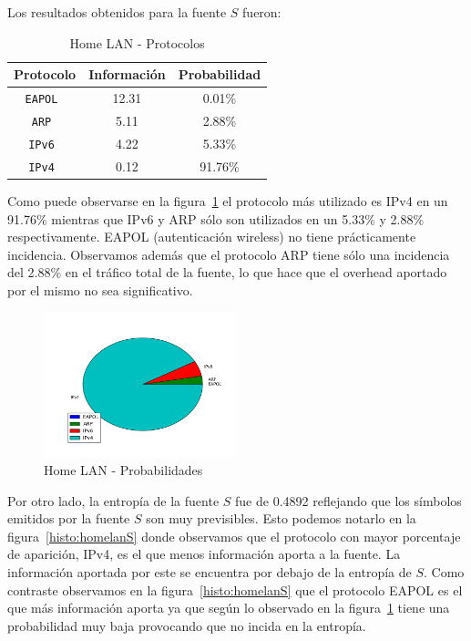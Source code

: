 \documentclass[final,inline,narroweqnarray,a4paper]{ieee}
\begin{document}
Los resultados obtenidos para la fuente $S$ fueron:

\begin{table}[H]
    \begin{center}
        \begin{tabular}{|c|c|c|}
            \hline
            \textbf{Protocolo} & \textbf{Información} & \textbf{Probabilidad} \\ \hline
            \texttt{EAPOL     }& 12.31       & 0.01\%     \\ \hline
            \texttt{ARP       }& 5.11        & 2.88\%     \\ \hline
            \texttt{IPv6      }& 4.22        & 5.33\%     \\ \hline
            \texttt{IPv4      }& 0.12        & 91.76\%    \\ \hline
        \end{tabular}
        \caption{Home LAN - Protocolos}
        \label{table:homelanS}
    \end{center}
\end{table}

Como puede observarse en la figura~\ref{torta:homelanS} el protocolo más utilizado es IPv4 en un 91.76\% mientras que IPv6 y ARP sólo son utilizados en un 5.33\% y 2.88\% respectivamente. EAPOL (autenticación wireless) no tiene prácticamente incidencia.
Observamos además que el protocolo ARP tiene sólo una incidencia del 2.88\% en el tráfico total de la fuente, lo que hace que el overhead aportado por el mismo no sea significativo. 

\begin{figure}[H]
    \begin{center}
        \includegraphics[width=0.5\textwidth]{plot/homelanS-pie.png}
        \caption{Home LAN - Probabilidades}
        \label{torta:homelanS}
    \end{center}
\end{figure}

Por otro lado, la entropía de la fuente $S$ fue de 0.4892 reflejando que los símbolos emitidos por la fuente $S$ son muy previsibles. Esto podemos notarlo en la figura~\ref{histo:homelanS} donde observamos que el protocolo con mayor porcentaje de aparición, IPv4,  es el que menos información aporta a la fuente. La información aportada por este se encuentra por debajo de la entropía de $S$. Como contraste observamos en la figura~\ref{histo:homelanS} que el protocolo EAPOL es el que más información aporta ya que según lo observado en la figura~\ref{torta:homelanS} tiene una probabilidad muy baja provocando que no incida en la entropía.
\end{document}
